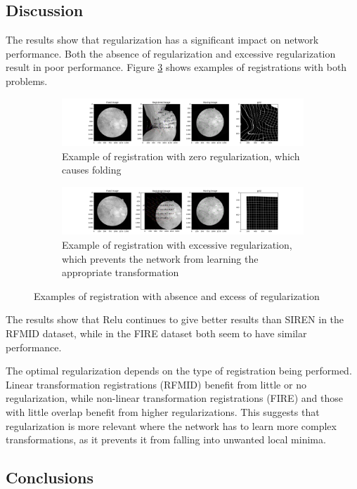 \subsection{Discussion}
\label{subsec:Discusion-regularization}

The results show that regularization has a significant impact on network performance. Both the absence of regularization and excessive regularization result in poor performance.
Figure \ref{fig:regularization_examples} shows examples of registrations with both problems.

\begin{figure}[tbp]
    \centering
    \begin{subfigure}[b]{0.45\textwidth}
        \centering
        \includegraphics[width=\textwidth]{imaxes/reg_examples/no_reg_example.png}
        \caption{Example of registration with zero regularization, which causes folding}
        \label{fig:no_reg_example}
    \end{subfigure}\hfill
    \begin{subfigure}[b]{0.45\textwidth}
        \centering
        \includegraphics[width=\textwidth]{imaxes/reg_examples/too_much_reg_example.png}
        \caption{Example of registration with excessive regularization, which prevents the network from learning the appropriate transformation}
        \label{fig:too_much_reg_example}
    \end{subfigure}
    \caption{Examples of registration with absence and excess of regularization}
    \label{fig:regularization_examples}
\end{figure}

The results show that Relu continues to give better results than SIREN in the RFMID dataset, while in the FIRE dataset both seem to have similar performance.

The optimal regularization depends on the type of registration being performed. Linear transformation registrations (RFMID) benefit from little or no regularization, while non-linear transformation registrations (FIRE) and those with little overlap benefit from higher regularizations.
This suggests that regularization is more relevant where the network has to learn more complex transformations, as it prevents it from falling into unwanted local minima.\subsection{Conclusions}
\label{subsec:Conclusions-regularization}

